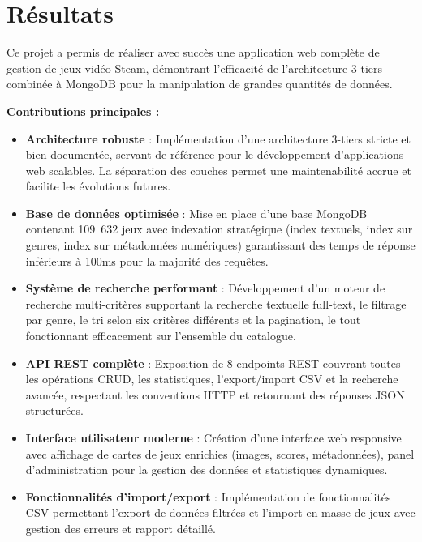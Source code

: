 \section{Résultats}
\label{sec:intro_sum_results}

Ce projet a permis de réaliser avec succès une application web complète de gestion de jeux vidéo Steam, démontrant l'efficacité de l'architecture 3-tiers combinée à MongoDB pour la manipulation de grandes quantités de données.

\textbf{Contributions principales :}

\begin{itemize}
    \item \textbf{Architecture robuste} : Implémentation d'une architecture 3-tiers stricte et bien documentée, servant de référence pour le développement d'applications web scalables. La séparation des couches permet une maintenabilité accrue et facilite les évolutions futures.
    
    \item \textbf{Base de données optimisée} : Mise en place d'une base MongoDB contenant 109~632 jeux avec indexation stratégique (index textuels, index sur genres, index sur métadonnées numériques) garantissant des temps de réponse inférieurs à 100ms pour la majorité des requêtes.
    
    \item \textbf{Système de recherche performant} : Développement d'un moteur de recherche multi-critères supportant la recherche textuelle full-text, le filtrage par genre, le tri selon six critères différents et la pagination, le tout fonctionnant efficacement sur l'ensemble du catalogue.
    
    \item \textbf{API REST complète} : Exposition de 8 endpoints REST couvrant toutes les opérations CRUD, les statistiques, l'export/import CSV et la recherche avancée, respectant les conventions HTTP et retournant des réponses JSON structurées.
    
    \item \textbf{Interface utilisateur moderne} : Création d'une interface web responsive avec affichage de cartes de jeux enrichies (images, scores, métadonnées), panel d'administration pour la gestion des données et statistiques dynamiques.
    
    \item \textbf{Fonctionnalités d'import/export} : Implémentation de fonctionnalités CSV permettant l'export de données filtrées et l'import en masse de jeux avec gestion des erreurs et rapport détaillé.
\end{itemize}

